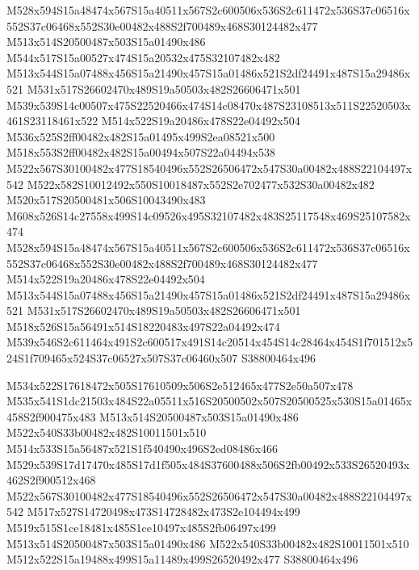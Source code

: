 \documentclass{article}
\begin{document}
\begin{multicols}{2}
M528x594S15a48474x567S15a40511x567S2c600506x536S2c611472x536S37c06516x552S37c06468x552S30e00482x488S2f700489x468S30124482x477 M513x514S20500487x503S15a01490x486 M544x517S15a00527x474S15a20532x475S32107482x482 M513x544S15a07488x456S15a21490x457S15a01486x521S2df24491x487S15a29486x521 M531x517S26602470x489S19a50503x482S26606471x501 M539x539S14c00507x475S22520466x474S14c08470x487S23108513x511S22520503x461S23118461x522 M514x522S19a20486x478S22e04492x504 M536x525S2ff00482x482S15a01495x499S2ea08521x500 M518x553S2ff00482x482S15a00494x507S22a04494x538 M522x567S30100482x477S18540496x552S26506472x547S30a00482x488S22104497x542 M522x582S10012492x550S10018487x552S2e702477x532S30a00482x482 M520x517S20500481x506S10043490x483 M608x526S14c27558x499S14c09526x495S32107482x483S25117548x469S25107582x474 M528x594S15a48474x567S15a40511x567S2c600506x536S2c611472x536S37c06516x552S37c06468x552S30e00482x488S2f700489x468S30124482x477 M514x522S19a20486x478S22e04492x504 M513x544S15a07488x456S15a21490x457S15a01486x521S2df24491x487S15a29486x521 M531x517S26602470x489S19a50503x482S26606471x501 M518x526S15a56491x514S18220483x497S22a04492x474 M539x546S2c611464x491S2c600517x491S14c20514x454S14c28464x454S1f701512x524S1f709465x524S37c06527x507S37c06460x507 S38800464x496

M534x522S17618472x505S17610509x506S2e512465x477S2e50a507x478 M535x541S1dc21503x484S22a05511x516S20500502x507S20500525x530S15a01465x458S2f900475x483 M513x514S20500487x503S15a01490x486 M522x540S33b00482x482S10011501x510 M514x533S15a56487x521S1f540490x496S2ed08486x466 M529x539S17d17470x485S17d1f505x484S37600488x506S2fb00492x533S26520493x462S2f900512x468 M522x567S30100482x477S18540496x552S26506472x547S30a00482x488S22104497x542 M517x527S14720498x473S14728482x473S2e104494x499 M519x515S1ce18481x485S1ce10497x485S2fb06497x499 M513x514S20500487x503S15a01490x486 M522x540S33b00482x482S10011501x510 M512x522S15a19488x499S15a11489x499S26520492x477 S38800464x496


\end{multicols}
\end{document}
